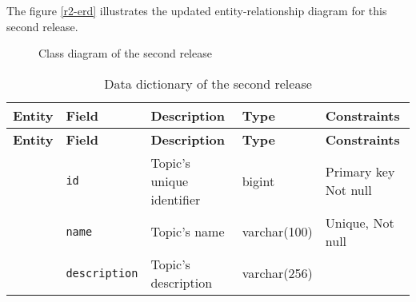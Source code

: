 \noindent The figure \ref{r2-erd} illustrates the updated entity-relationship diagram for this second release.

\begin{landscape}
    \begin{figure}[hbt!]
        \centering
        
        \caption{Class diagram of the second release}
        \label{r2-class}
    \end{figure}
\end{landscape}

\begin{landscape}
    \begin{longtable}{ | m{} | m{} | m{} | m{} | m{} | }
        \caption{Data dictionary of the second release}   \label{tab-r2dd}                                                                                                                                                                  \\
        \hline
        \textbf{Entity}                                                  & \textbf{Field}                            & \textbf{Description}                                                 & \textbf{Type} & \textbf{Constraints}          \\
        \hline
        \endfirsthead
        \hline
        \textbf{Entity}                                                  & \textbf{Field}                            & \textbf{Description}                                                 & \textbf{Type} & \textbf{Constraints}          \\
        \hline
        \endhead
        \hline
        \endfoot
        \endlastfoot
        \multirow[t]{5}{5em}{\textbf{Topic}}                             & \texttt{id}                               & Topic's unique identifier                                            & bigint        & Primary key \newline Not null \\
        \cline{2-5}
                                                                         & \texttt{name}                             & Topic's name                                                         & varchar(100)  & Unique, Not null              \\
        \cline{2-5}
                                                                         & \texttt{description}                      & Topic's description                                                  & varchar(256)  &                               \\

\end{longtable}
\end{landscape}
